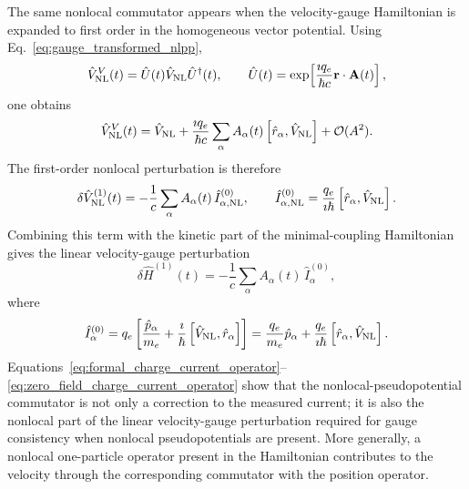 The same nonlocal commutator appears when the velocity-gauge Hamiltonian
is expanded to first order in the homogeneous vector potential.  Using
Eq.~\eqref{eq:gauge_transformed_nlpp},
\begin{equation}
  \hat V_{\rm NL}^{V}(t)
  =
  \hat U(t)\hat V_{\rm NL}\hat U^\dagger(t),
  \qquad
  \hat U(t)
  =
  \exp\!\left[
    \frac{\imath q_e}{\hbar c}
    \mathbf r\cdot\mathbf A(t)
  \right],
  \label{eq:nlpp_gauge_transform_repeated}
\end{equation}
one obtains
\begin{equation}
  \hat V_{\rm NL}^{V}(t)
  =
  \hat V_{\rm NL}
  +
  \frac{\imath q_e}{\hbar c}
  \sum_\alpha
  A_\alpha(t)
  \left[
    \hat r_\alpha,\hat V_{\rm NL}
  \right]
  +
  {\cal O}(A^2).
  \label{eq:nlpp_gauge_transform_linear}
\end{equation}
The first-order nonlocal perturbation is therefore
\begin{equation}
  \delta\hat V_{\rm NL}^{(1)}(t)
  =
  -
  \frac{1}{c}
  \sum_\alpha
  A_\alpha(t)\,
  \hat I_{\alpha,{\rm NL}}^{(0)},
  \qquad
  \hat I_{\alpha,{\rm NL}}^{(0)}
  =
  \frac{q_e}{\imath\hbar}
  \left[
    \hat r_\alpha,\hat V_{\rm NL}
  \right].
  \label{eq:nlpp_linear_perturbation_current}
\end{equation}
Combining this term with the kinetic part of the minimal-coupling
Hamiltonian gives the linear velocity-gauge perturbation
\begin{equation}
  \delta\hat H^{(1)}(t)
  =
  -
  \frac{1}{c}
  \sum_\alpha
  A_\alpha(t)\,
  \hat I_{\alpha}^{(0)},
  \label{eq:linear_velocity_gauge_perturbation}
\end{equation}
where
\begin{equation}
  \hat I_{\alpha}^{(0)}
  =
  q_e
  \left[
    \frac{\hat p_\alpha}{m_e}
    +
    \frac{\imath}{\hbar}
    \left[
      \hat V_{\rm NL},\hat r_\alpha
    \right]
  \right]
  =
  \frac{q_e}{m_e}\hat p_\alpha
  +
  \frac{q_e}{\imath\hbar}
  \left[
    \hat r_\alpha,\hat V_{\rm NL}
  \right].
  \label{eq:zero_field_charge_current_operator}
\end{equation}
Equations~\eqref{eq:formal_charge_current_operator}--\eqref{eq:zero_field_charge_current_operator}
show that the nonlocal-pseudopotential commutator is not only a
correction to the measured current; it is also the nonlocal part of the
linear velocity-gauge perturbation required for gauge consistency when
nonlocal pseudopotentials are present.\cite{Luber-rt-tddft}  More
generally, a nonlocal one-particle operator present in the Hamiltonian
contributes to the velocity through the corresponding commutator with the
position operator.

